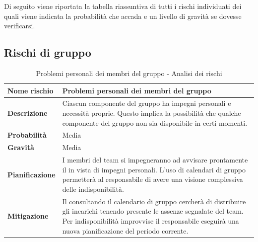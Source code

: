 \documentclass[12pt,a4paper]{article}
\begin{document}
Di seguito viene riportata la tabella riassuntiva di tutti i rischi individuati dei quali viene indicata la probabilità che accada e un livello di gravità se dovesse verificarsi.

\subsection{Rischi di gruppo}

\begin{table}[H]
	\begin{center}
		\begin{tabular}{p{} p{}}
			\toprule
			\textbf{Nome rischio} & \textbf{Problemi personali dei membri del gruppo} \\
			\midrule
			\midrule
			\textbf{Descrizione} & Ciascun componente del gruppo ha impegni personali e necessità proprie. Questo implica la possibilità che qualche componente del gruppo non sia disponibile in certi momenti. \\
			\midrule
			\textbf{Probabilità} & Media \\
			\midrule
			\textbf{Gravità} & Media \\
			\midrule
			\textbf{Pianificazione} & I membri del team si impegneranno ad avvisare prontamente il \PM{} in vista di impegni personali. L’uso di calendari di gruppo permetterà al responsabile di avere una visione complessiva delle indisponibilità.  \\
			\midrule
			\textbf{Mitigazione} & Il \PM{} consultando il calendario di gruppo cercherà di distribuire gli incarichi tenendo presente le assenze segnalate del team. Per indisponibilità improvvise il responsabile eseguirà una nuova pianificazione del periodo corrente. \\
			\bottomrule
		\end{tabular}
		\caption{Problemi personali dei membri del gruppo - Analisi dei rischi}
	\end{center}
\end{table}
\end{document}
